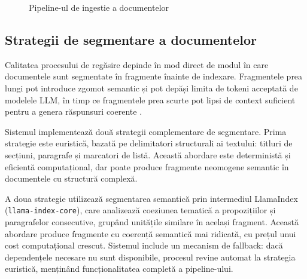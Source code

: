 \documentclass[12pt, a4paper, oneside, romanian]{teza-upb}
\begin{document}
\begin{figure}[H]
\centering
{}
\caption{Pipeline-ul de ingestie a documentelor}
\label{fig:rag-ingest}
\end{figure}

\subsection{Strategii de segmentare a documentelor}

Calitatea procesului de regăsire depinde în mod direct de modul în care documentele sunt segmentate în fragmente înainte de indexare. Fragmentele prea lungi pot introduce zgomot semantic și pot depăși limita de tokeni acceptată de modelele LLM, în timp ce fragmentele prea scurte pot lipsi de context suficient pentru a genera răspunsuri coerente \cite{lewis2020retrieval}.

Sistemul implementează două strategii complementare de segmentare. Prima strategie este euristică, bazată pe delimitatori structurali ai textului: titluri de secțiuni, paragrafe și marcatori de listă. Această abordare este deterministă și eficientă computațional, dar poate produce fragmente neomogene semantic în documentele cu structură complexă.

A doua strategie utilizează segmentarea semantică prin intermediul LlamaIndex (\texttt{llama-index-core}), care analizează coeziunea tematică a propozițiilor și paragrafelor consecutive, grupând unitățile similare în același fragment. Această abordare produce fragmente cu coerență semantică mai ridicată, cu prețul unui cost computațional crescut. Sistemul include un mecanism de fallback: dacă dependențele necesare nu sunt disponibile, procesul revine automat la strategia euristică, menținând funcționalitatea completă a pipeline-ului.
\end{document}
